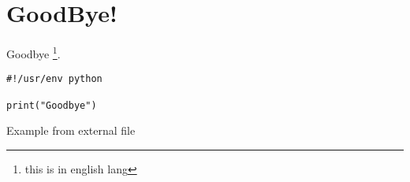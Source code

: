 \section{GoodBye!}

Goodbye \footnote{this is in english lang}.

\begin{listing}[ht]
\begin{verbatim}
#!/usr/env python

print("Goodbye")
\end{verbatim}
\caption{Example from external file}
\label{listing:3}
\end{listing}
